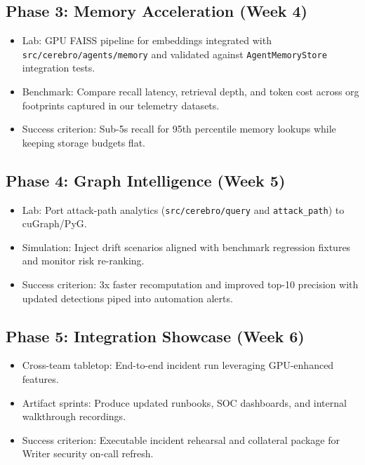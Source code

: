 \documentclass[11pt]{scrartcl}
\begin{document}
\subsection*{Phase 3: Memory Acceleration (Week 4)}
\begin{itemize}
  \item Lab: GPU FAISS pipeline for embeddings integrated with \texttt{src/cerebro/agents/memory} and validated against \texttt{AgentMemoryStore} integration tests.
  \item Benchmark: Compare recall latency, retrieval depth, and token cost across org footprints captured in our telemetry datasets.
  \item Success criterion: Sub-5s recall for 95th percentile memory lookups while keeping storage budgets flat.
\end{itemize}

\subsection*{Phase 4: Graph Intelligence (Week 5)}
\begin{itemize}
  \item Lab: Port attack-path analytics (\texttt{src/cerebro/query} and \texttt{attack\_path}) to cuGraph/PyG.
  \item Simulation: Inject drift scenarios aligned with benchmark regression fixtures and monitor risk re-ranking.
  \item Success criterion: 3x faster recomputation and improved top-10 precision with updated detections piped into automation alerts.
\end{itemize}

\subsection*{Phase 5: Integration Showcase (Week 6)}
\begin{itemize}
  \item Cross-team tabletop: End-to-end incident run leveraging GPU-enhanced features.
  \item Artifact sprints: Produce updated runbooks, SOC dashboards, and internal walkthrough recordings.
  \item Success criterion: Executable incident rehearsal and collateral package for Writer security on-call refresh.
\end{itemize}
\end{document}
